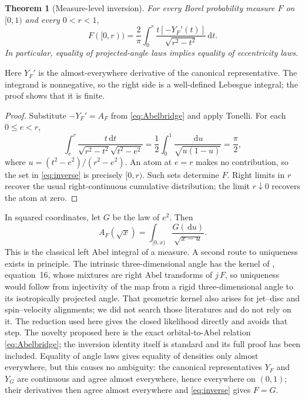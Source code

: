 \documentclass[11pt,a4paper]{article}
\newtheorem{theorem}{Theorem}[section]
\theoremstyle{remark}\newtheorem{remark}[theorem]{Remark}
\newcommand{\dd}{\,\mathrm d}
\begin{document}
\begin{theorem}[Measure-level inversion]\label{thm:inverse}
For every Borel probability measure $F$ on $[0,1)$ and every $0<r<1$,
\begin{equation}\label{eq:inverse}
\boxed{\quad F([0,r))=
\frac{2}{\pi}\int_0^r
\frac{t[-Y_F'(t)]}{\sqrt{r^2-t^2}}\dd t.\quad}
\end{equation}
In particular, equality of projected-angle laws implies equality of eccentricity laws.
\end{theorem}

Here $Y_F'$ is the almost-everywhere derivative of the canonical representative. The integrand is nonnegative, so the right side is a well-defined Lebesgue integral; the proof shows that it is finite.

\begin{proof}
Substitute $-Y_F'=A_F$ from \eqref{eq:Abelbridge} and apply Tonelli. For each $0\le e<r$,
\begin{equation}
\int_e^r\frac{t\dd t}{\sqrt{r^2-t^2}\sqrt{t^2-e^2}}
=\frac12\int_0^1\frac{\dd u}{\sqrt{u(1-u)}}=\frac\pi2,
\end{equation}
where $u=(t^2-e^2)/(r^2-e^2)$. An atom at $e=r$ makes no contribution, so the set in \eqref{eq:inverse} is precisely $[0,r)$. Such sets determine $F$. Right limits in $r$ recover the usual right-continuous cumulative distribution; the limit $r\downarrow0$ recovers the atom at zero.
\end{proof}

In squared coordinates, let $G$ be the law of $e^2$. Then
\begin{equation}
A_F(\sqrt{x})=\int_{[0,x)}\frac{G(\dd u)}{\sqrt{x-u}}.
\end{equation}
This is the classical left Abel integral of a measure. A second route to uniqueness exists in principle. The intrinsic three-dimensional angle has the kernel of \citet{Hwang2022}, equation~16, whose mixtures are right Abel transforms of $j\,F$, so uniqueness would follow from injectivity of the map from a rigid three-dimensional angle to its isotropically projected angle. That geometric kernel also arises for jet--disc and spin--velocity alignments; we did not search those literatures and do not rely on it. The reduction used here gives the closed likelihood directly and avoids that step. The novelty proposed here is the exact orbital-to-Abel relation \eqref{eq:Abelbridge}; the inversion identity itself is standard and its full proof has been included. Equality of angle laws gives equality of densities only almost everywhere, but this causes no ambiguity: the canonical representatives $Y_F$ and $Y_G$ are continuous and agree almost everywhere, hence everywhere on $(0,1)$; their derivatives then agree almost everywhere and \eqref{eq:inverse} gives $F=G$.
\end{document}
